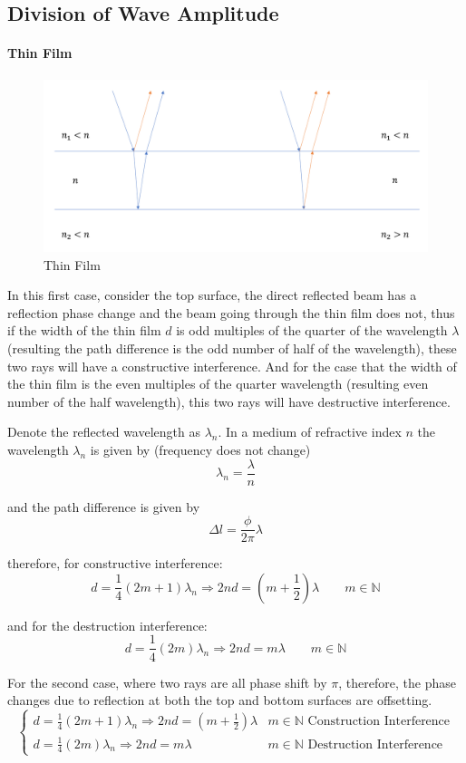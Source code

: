 \documentclass[openany]{book}
\begin{document}
\subsection{Division of Wave Amplitude}

\paragraph{Thin Film}
\begin{figure}[H]
\centering
\includegraphics[scale=0.6]{Figure/19.PNG}
\caption{Thin Film}
\end{figure}
In this first case, consider the top surface, the direct reflected beam has a reflection phase change and the beam going through the thin film does not, thus if the width of the thin film $d$ is odd multiples of the quarter of the wavelength $\lambda $ (resulting the path difference is the odd number of half of the wavelength), these two rays will have a constructive interference. And for the case that the width of the thin film is the even multiples of the quarter wavelength (resulting even number of the half wavelength), this two rays will have destructive interference. 

Denote the reflected wavelength as $\lambda _n$. In a medium of refractive index $n$ the wavelength $\lambda _n$ is given by (frequency does not change)
\[\lambda _n=\frac{\lambda }{n}\]

and the path difference is given by
\[\Delta l=\frac{\phi }{2\pi}\lambda\]

therefore, for constructive interference:
\[d = \frac{1}{4}(2m+1)\lambda _n\Rightarrow 2nd=\left(m+\frac{1}{2}\right)\lambda \qquad m\in \mathbb{N}\]

and for the destruction interference:
\[d = \frac{1}{4}(2m)\lambda _n\Rightarrow 2nd=m\lambda \qquad m\in \mathbb{N}\]

For the second case, where two rays are all phase shift by $\pi$, therefore, the phase changes due to reflection at both the top and bottom surfaces are offsetting.
\[\begin{cases}
d = \frac{1}{4}(2m+1)\lambda _n\Rightarrow 2nd=\left(m+\frac{1}{2}\right)\lambda &m\in \mathbb{N} \textrm{ Construction Interference}\\
d = \frac{1}{4}(2m)\lambda _n\Rightarrow 2nd=m\lambda &m\in \mathbb{N} \textrm{ Destruction Interference}
\end{cases}\]
\end{document}
